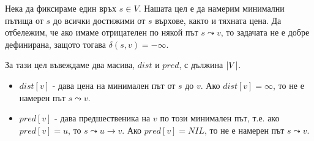 Нека да фиксираме един връх $s \in V$.
Нашата цел е да намерим минимални пътища от $s$ до всички достижими от $s$ върхове,
както и тяхната цена. 
Да отбележим, че ако имаме отрицателен по някой път $s \leadsto v$, то задачата не е добре 
дефинирана, защото тогава $\delta(s,v) = -\infty$.

За тази цел въвеждаме два масива, $dist$ и $pred$, с дължина $\vert{V}\vert$.
\begin{itemize}
\item 
  $dist[v]$ - дава цена на минимален път от $s$ до $v$.
  Ако $dist[v] = \infty$, то не е намерен път $s\leadsto v$.
\item
  $pred[v]$ - дава предшественика на $v$ по този минимален път, т.е.
  ако $pred[v] = u$, то $s \leadsto u \to v$.
  Ако $pred[v] = NIL$, то не е намерен път $s \leadsto v$.
\end{itemize}


